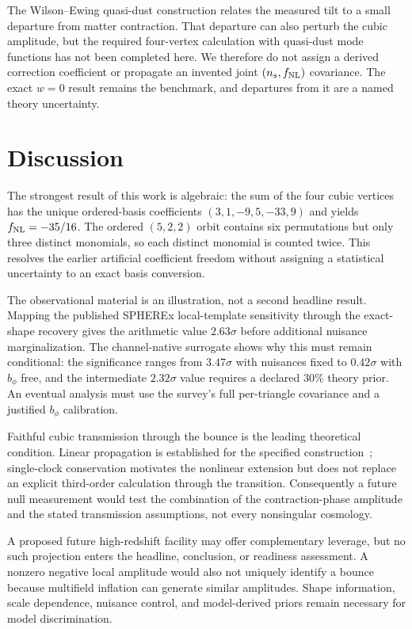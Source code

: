 \documentclass[aps,prd,twocolumn,superscriptaddress,showpacs,preprintnumbers,nofootinbib,longbibliography,floatfix]{revtex4-2}
\newcommand{\fnl}{f_{\rm NL}}
\begin{document}
The Wilson--Ewing quasi-dust construction relates the measured tilt to a small departure from matter contraction. That departure can also perturb the cubic amplitude, but the required four-vertex calculation with quasi-dust mode functions has not been completed here. We therefore do not assign a derived correction coefficient or propagate an invented joint $(n_s,\fnl)$ covariance. The exact $w=0$ result remains the benchmark, and departures from it are a named theory uncertainty.

\section{Discussion}
\label{sec:discussion}

The strongest result of this work is algebraic: the sum of the four cubic vertices has the unique ordered-basis coefficients $(3,1,-9,5,-33,9)$ and yields $\fnl=-35/16$. The ordered $(5,2,2)$ orbit contains six permutations but only three distinct monomials, so each distinct monomial is counted twice. This resolves the earlier artificial coefficient freedom without assigning a statistical uncertainty to an exact basis conversion.

The observational material is an illustration, not a second headline result. Mapping the published SPHEREx local-template sensitivity through the exact-shape recovery gives the arithmetic value $2.63\sigma$ before additional nuisance marginalization. The channel-native surrogate shows why this must remain conditional: the significance ranges from $3.47\sigma$ with nuisances fixed to $0.42\sigma$ with $b_\phi$ free, and the intermediate $2.32\sigma$ value requires a declared 30\% theory prior. An eventual analysis must use the survey's full per-triangle covariance and a justified $b_\phi$ calibration.

Faithful cubic transmission through the bounce is the leading theoretical condition. Linear propagation is established for the specified construction~\cite{WilsonEwing:2012}; single-clock conservation motivates the nonlinear extension but does not replace an explicit third-order calculation through the transition. Consequently a future null measurement would test the combination of the contraction-phase amplitude and the stated transmission assumptions, not every nonsingular cosmology.

A proposed future high-redshift facility may offer complementary leverage, but no such projection enters the headline, conclusion, or readiness assessment. A nonzero negative local amplitude would also not uniquely identify a bounce because multifield inflation can generate similar amplitudes. Shape information, scale dependence, nuisance control, and model-derived priors remain necessary for model discrimination.
\end{document}
